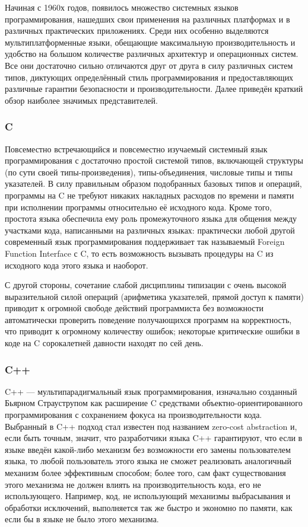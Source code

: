 \documentclass[12pt]{article}
\begin{document}
Начиная с 1960х годов, появилось множество системных языков программирования,
нашедших свои применения на различных платформах и в различных практических
приложениях. Среди них особенно выделяются мультиплатформенные языки, обещающие
максимальную производительность и удобство на большом количестве различных
архитектур и операционных систем. Все они достаточно сильно отличаются друг от
друга в силу различных систем типов, диктующих определённый стиль
программирования и предоставляющих различные гарантии безопасности и
производительности. Далее приведён краткий обзор наиболее значимых
представителей.

\subsubsection{C}

Повсеместно встречающийся и повсеместно изучаемый системный язык
программирования с достаточно простой системой типов, включающей структуры
(по сути своей типы-произведения), типы-объединения, числовые типы и типы
указателей. В силу правильным образом подобранных базовых типов и операций,
программы на C не требуют никаких накладных расходов по времени и памяти при
исполнении программы относительно её исходного кода. Кроме того, простота языка
обеспечила ему роль промежуточного языка для общения между участками кода,
написанными на различных языках: практически любой другой современный язык
программирования поддерживает так называемый Foreign Function Interface с C, то
есть возможность вызывать процедуры на C из исходного кода этого языка и
наоборот.

С другой стороны, сочетание слабой дисциплины типизации с очень высокой
выразительной силой операций (арифметика указателей, прямой доступ к памяти)
приводит к огромной свободе действий программиста без возможности автоматически
проверить поведение получающихся программ на корректность, что приводит к
огромному количеству ошибок; некоторые критические ошибки в коде на C
сорокалетней давности находят по сей день.

\subsubsection{C++}

C++ --- мультипарадигмальный язык программирования, изначально созданный Бьярном
Страуструпом как расширение C средствами объектно-ориентированного
программирования с сохранением фокуса на производительности кода. Выбранный в
C++ подход стал известен под названием zero-cost abstraction и, если быть
точным, значит, что разработчики языка C++ гарантируют, что если в языке введён
какой-либо механизм без возможности его замены пользователем языка, то любой
пользователь этого языка не сможет реализовать аналогичный механизм более
эффективным способом; более того, сам факт существования этого механизма не
должен влиять на производительность кода, его не использующего. Например, код,
не использующий механизмы выбрасывания и обработки исключений, выполняется так
же быстро и экономно по памяти, как если бы в языке не было этого механизма.
\end{document}
